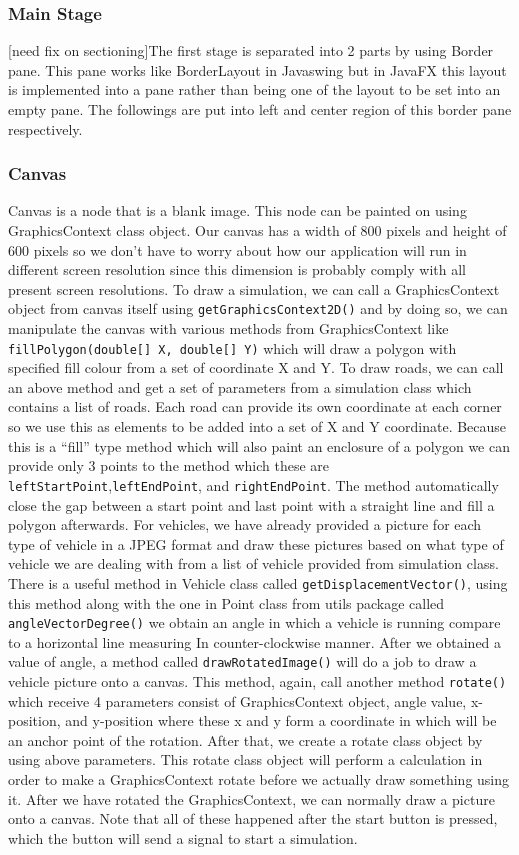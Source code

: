 \documentclass[11pt]{article}
\begin{document}
\subsubsection{Main Stage}
	[need fix on sectioning]The first stage is separated into 2 parts by using Border pane. This pane works like BorderLayout in Javaswing but in JavaFX this layout is implemented into a pane rather than being one of the layout to be set into an empty pane. The followings are put into left and center region of this border pane respectively.
\subsubsection{Canvas}
Canvas is a node that is a blank image. This node can be painted on using GraphicsContext class object. Our canvas has a width of 800 pixels and height of 600 pixels so we don’t have to worry about how our application will run in different screen resolution since this dimension is probably comply with all present screen resolutions. To draw a simulation, we can call a GraphicsContext object from canvas itself using \texttt{getGraphicsContext2D()} and by doing so, we can manipulate the canvas with various methods from GraphicsContext like \texttt{fillPolygon(double[] X, double[] Y)} which will draw a polygon with specified fill colour from a set of coordinate X and Y. To draw roads, we can call an above method and get a set of parameters from a simulation class which contains a list of roads. Each road can provide its own coordinate at each corner so we use this as elements to be added into a set of X and Y coordinate. Because this is a “fill” type method which will also paint an enclosure of a polygon we can provide only 3 points to the method which these are \texttt{leftStartPoint},\texttt{leftEndPoint}, and \texttt{rightEndPoint}. The method automatically close the gap between a start point and last point with a straight line and fill a polygon afterwards. For vehicles, we have already provided a picture for each type of vehicle in a JPEG format and draw these pictures based on what type of vehicle we are dealing with from a list of vehicle provided from simulation class. There is a useful method in Vehicle class called \texttt{getDisplacementVector()}, using this method along with the one in Point class from utils package called \texttt{angleVectorDegree()} we obtain an angle in which a vehicle is running compare to a horizontal line measuring In counter-clockwise manner. After we obtained a value of angle, a method called \texttt{drawRotatedImage()} will do a job to draw a vehicle picture onto a canvas. This method, again, call another method \texttt{rotate()} which receive 4 parameters consist of GraphicsContext object, angle value, x-position, and y-position where these x and y form a coordinate in which will be an anchor point of the rotation. After that, we create a rotate class object by using above parameters. This rotate class object will perform a calculation in order to make a GraphicsContext rotate before we actually draw something using it. After we have rotated the GraphicsContext, we can normally draw a picture onto a canvas. Note that all of these happened after the start button is pressed, which the button will send a signal to start a simulation.
\end{document}
